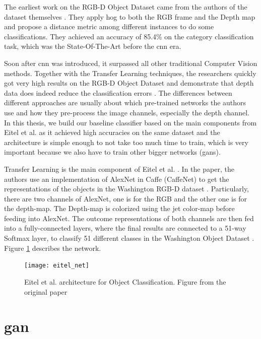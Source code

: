 The earliest work on the RGB-D Object Dataset came from the authors of the dataset
themselves \cite{lai_recognition}. They apply \acrfull{hog} to both the RGB frame and the
Depth map and propose a distance metric among different instances to do some
classifications. They achieved an accuracy of 85.4\% on the category classification task,
which was the State-Of-The-Art before the \acrshort{cnn} era.

Soon after \acrshort{cnn} was introduced, it surpassed all other traditional Computer
Vision methods. Together with the Transfer Learning techniques, the researchers quickly
got very high results on the RGB-D Object Dataset and demonstrate that depth data does
indeed reduce the classification errors \cite{eitel, alexandre}. The differences between
different approaches are usually about which pre-trained networks the authors use and how
they pre-process the image channels, especially the depth channel. In this thesis, we
build our baseline classifier based on the main components from Eitel et al.  \cite{eitel}
as it achieved high accuracies on the same dataset and the architecture is simple enough
to not take too much time to train, which is very important because we also have to train
other bigger networks (\acrshort{gan}s).

Transfer Learning is the main component of Eitel et al. \cite{eitel}. In the paper, the
authors use an implementation of AlexNet in Caffe (CaffeNet) to get the representations of
the objects in the Washington RGB-D dataset \cite{washington_rgbd}. Particularly, there
are two channels of AlexNet, one is for the RGB and the other one is for the depth-map.
The Depth-map is colorized using the jet color-map before feeding into AlexNet. The
outcome representations of both channels are then fed into a fully-connected layers, where
the final results are connected to a 51-way Softmax layer, to classify 51 different
classes in the Washington Object Dataset \cite{washington_rgbd}. Figure
\ref{fig:eitel_net} describes the network.

\begin{figure}[h]
  \centering
  \texttt{[image: eitel\_net]}
  \caption{Eitel et al. architecture for Object Classification. Figure from the original
	  paper \cite{eitel}}\label{fig:eitel_net}
\end{figure}

\section{\acrfull{gan}}


